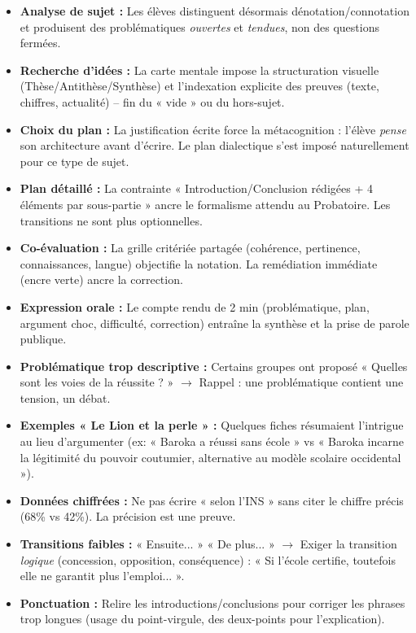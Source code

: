 \documentclass[11pt]{article}
\newcommand{\cle}[1]{{\popxbold\color{popdark}#1}}
\begin{document}
\begin{aretenir}
\begin{itemize}
\item \textbf{Analyse de sujet :} Les élèves distinguent désormais dénotation/connotation et produisent des problématiques \emph{ouvertes} et \emph{tendues}, non des questions fermées.
\item \textbf{Recherche d'idées :} La carte mentale impose la structuration visuelle (Thèse/Antithèse/Synthèse) et l'indexation explicite des preuves (texte, chiffres, actualité) -- fin du « vide » ou du hors-sujet.
\item \textbf{Choix du plan :} La justification écrite force la métacognition : l'élève \emph{pense} son architecture avant d'écrire. Le plan dialectique s'est imposé naturellement pour ce type de sujet.
\item \textbf{Plan détaillé :} La contrainte « Introduction/Conclusion rédigées + 4 éléments par sous-partie » ancre le formalisme attendu au Probatoire. Les transitions ne sont plus optionnelles.
\item \textbf{Co-évaluation :} La grille critériée partagée (cohérence, pertinence, connaissances, langue) objectifie la notation. La remédiation immédiate (encre verte) ancre la correction.
\item \textbf{Expression orale :} Le compte rendu de 2 min (problématique, plan, argument choc, difficulté, correction) entraîne la synthèse et la prise de parole publique.
\end{itemize}
\end{aretenir}

\begin{attention}
\begin{itemize}
\item \textbf{Problématique trop descriptive :} Certains groupes ont proposé « Quelles sont les voies de la réussite ? » $\rightarrow$ Rappel : une problématique contient une \cle{tension}, un \cle{débat}.
\item \textbf{Exemples « Le Lion et la perle » :} Quelques fiches résumaient l'intrigue au lieu d'argumenter (ex: « Baroka a réussi sans école » vs « Baroka incarne la légitimité du pouvoir coutumier, alternative au modèle scolaire occidental »).
\item \textbf{Données chiffrées :} Ne pas écrire « selon l'INS » sans citer le chiffre précis (68\% vs 42\%). La précision est une preuve.
\item \textbf{Transitions faibles :} « Ensuite... » « De plus... » $\rightarrow$ Exiger la transition \emph{logique} (concession, opposition, conséquence) : « Si l'école certifie, toutefois elle ne garantit plus l'emploi... ».
\item \textbf{Ponctuation :} Relire les introductions/conclusions pour corriger les phrases trop longues (usage du point-virgule, des deux-points pour l'explication).
\end{itemize}
\end{attention}
\end{document}
